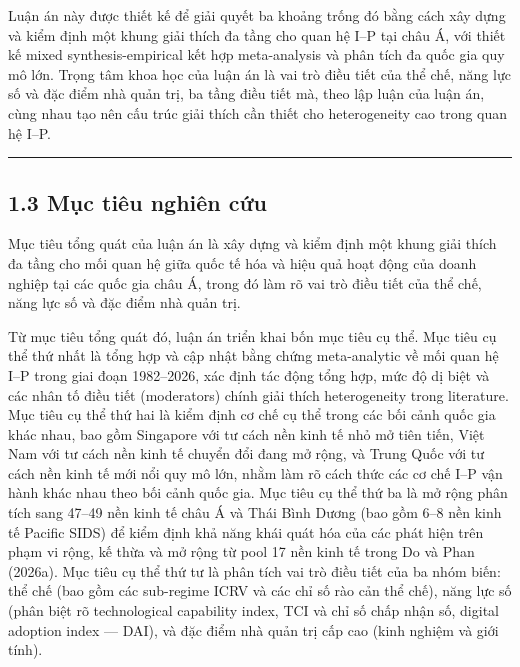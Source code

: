 \documentclass[12pt,a4paper]{article}
\begin{document}
Luận án này được thiết kế để giải quyết ba khoảng trống đó bằng cách xây
dựng và kiểm định một khung giải thích đa tầng cho quan hệ I--P tại châu
Á, với thiết kế mixed synthesis-empirical kết hợp meta-analysis và phân
tích đa quốc gia quy mô lớn. Trọng tâm khoa học của luận án là vai trò
điều tiết của thể chế, năng lực số và đặc điểm nhà quản trị, ba tầng
điều tiết mà, theo lập luận của luận án, cùng nhau tạo nên cấu trúc giải
thích cần thiết cho heterogeneity cao trong quan hệ I--P.

\begin{center}\rule{0.5\linewidth}{0.5pt}\end{center}

\hypertarget{13-mux1ee5c-tiuxeau-nghiuxean-cux1ee9u}{%
\subsection{1.3 Mục tiêu nghiên
cứu}\label{13-mux1ee5c-tiuxeau-nghiuxean-cux1ee9u}}

Mục tiêu tổng quát của luận án là xây dựng và kiểm định một khung giải
thích đa tầng cho mối quan hệ giữa quốc tế hóa và hiệu quả hoạt động của
doanh nghiệp tại các quốc gia châu Á, trong đó làm rõ vai trò điều tiết
của thể chế, năng lực số và đặc điểm nhà quản trị.

Từ mục tiêu tổng quát đó, luận án triển khai bốn mục tiêu cụ thể. Mục
tiêu cụ thể thứ nhất là tổng hợp và cập nhật bằng chứng meta-analytic về
mối quan hệ I--P trong giai đoạn 1982--2026, xác định tác động tổng hợp,
mức độ dị biệt và các nhân tố điều tiết (moderators) chính giải thích
heterogeneity trong literature. Mục tiêu cụ thể thứ hai là kiểm định cơ
chế cụ thể trong các bối cảnh quốc gia khác nhau, bao gồm Singapore với
tư cách nền kinh tế nhỏ mở tiên tiến, Việt Nam với tư cách nền kinh tế
chuyển đổi đang mở rộng, và Trung Quốc với tư cách nền kinh tế mới nổi
quy mô lớn, nhằm làm rõ cách thức các cơ chế I--P vận hành khác nhau
theo bối cảnh quốc gia. Mục tiêu cụ thể thứ ba là mở rộng phân tích sang
47--49 nền kinh tế châu Á và Thái Bình Dương (bao gồm 6--8 nền kinh tế
Pacific SIDS) để kiểm định khả năng khái quát hóa của các phát hiện trên
phạm vi rộng, kế thừa và mở rộng từ pool 17 nền kinh tế trong Do và Phan
(2026a). Mục tiêu cụ thể thứ tư là phân tích vai trò điều tiết của ba
nhóm biến: thể chế (bao gồm các sub-regime ICRV và các chỉ số rào cản
thể chế), năng lực số (phân biệt rõ technological capability index, TCI
và chỉ số chấp nhận số, digital adoption index --- DAI), và đặc điểm nhà
quản trị cấp cao (kinh nghiệm và giới tính).
\end{document}
